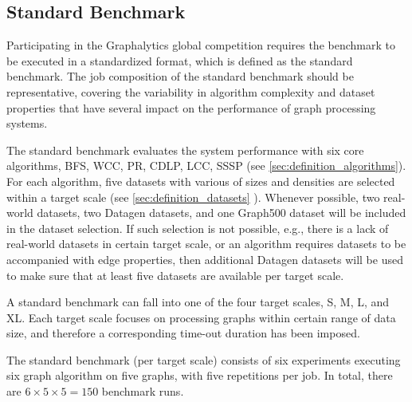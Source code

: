 \subsection{Standard Benchmark}
\label{sec:process:type:standard}
Participating in the Graphalytics global competition requires the benchmark to be executed in a standardized format, which is defined as the standard benchmark. The job composition of the standard benchmark should be representative, covering the variability in algorithm complexity and dataset properties that have several impact on the performance of graph processing systems.

The standard benchmark evaluates the system performance with six core algorithms, BFS, WCC, PR, CDLP, LCC, SSSP (see \autoref{sec:definition_algorithms}). For each algorithm, five datasets with various of sizes and densities are selected within a target scale (see \autoref{sec:definition_datasets} ). Whenever possible, two real-world datasets, two Datagen datasets, and one Graph500 dataset will be included in the dataset selection. If such selection is not possible, e.g., there is a lack of real-world datasets in certain target scale, or an algorithm requires datasets to be accompanied with edge properties, then additional Datagen datasets will be used to make sure that at least five datasets are available per target scale.

A standard benchmark can fall into one of the four target scales, S, M, L, and XL. Each target scale focuses on processing graphs within certain range of data size, and therefore a corresponding time-out duration has been imposed.  

The standard benchmark (per target scale) consists of six experiments executing six graph algorithm on five graphs, with five repetitions per job. In total, there are $6 \times 5 \times 5 = 150$ benchmark runs.



